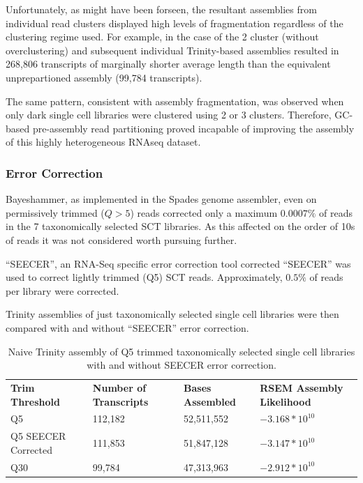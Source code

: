 Unfortunately, as might have been forseen, the resultant assemblies from individual
read clusters displayed high levels of fragmentation regardless of the clustering
regime used.  For example, in the case of the 2 cluster (without overclustering) 
and subsequent individual Trinity-based assemblies resulted in 268,806 transcripts
of marginally shorter average length than the equivalent unprepartioned assembly
(99,784 transcripts).

The same pattern, consistent with assembly fragmentation, 
was observed when only dark single cell libraries were clustered using 
2 or 3 clusters. 
Therefore, GC-based pre-assembly read partitioning proved incapable of improving
the assembly of this highly heterogeneous RNAseq dataset.


\subsubsection{Error Correction}

Bayeshammer, as implemented in the Spades genome assembler, even on permissively trimmed
(\(Q>5\)) reads corrected only a maximum \(0.0007\%\) of reads in the 7 taxonomically selected SCT libraries.
As this affected on the order of 10s of reads it was not considered worth pursuing further.

``SEECER'', an RNA-Seq specific error correction tool corrected 
``SEECER'' was used to correct lightly trimmed (Q5) SCT reads.  
Approximately, \(0.5\%\) of reads per library were corrected.

Trinity assemblies of just taxonomically selected single cell libraries were
then compared with and without ``SEECER'' error correction.
\begin{table}[h]
     \begin{tabular}{@{}|l||l|l|l|@{}}
         \cmidrule(r){1-6} \cmidrule(l){8-8}
         \textbf{Trim Threshold} & \textbf{Number of Transcripts} & \textbf{Bases Assembled} & \textbf{RSEM Assembly Likelihood} \\
         \cmidrule{}
         Q5 &  112,182 & 52,511,552 & \(-3.168 * 10^{10}\) \\
         Q5 SEECER Corrected & 111,853 &  51,847,128 & \(-3.147*10^{10}\) \\
         Q30 & 99,784 & 47,313,963 & \(-2.912*10^{10}\)  \\ 
    \end{tabular}
    \caption{Naive Trinity assembly of Q5 trimmed taxonomically selected single cell libraries
        with and without SEECER error correction.}
    \label{tab:trim_assembly}
\end{table}

